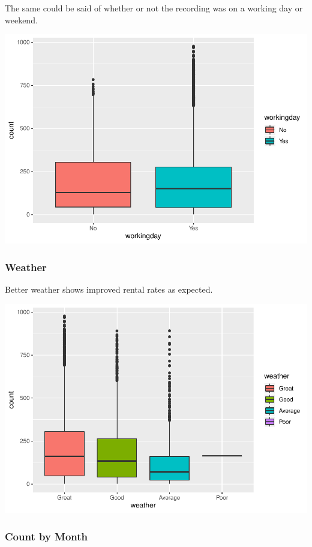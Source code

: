 \documentclass[american,]{article}
\begin{document}
The same could be said of whether or not the recording was on a working day or weekend.

\includegraphics{BikeSharingDemand_files/figure-latex/train.mod.1.workingday-1.pdf}

\newpage

\hypertarget{weather}{%
\subsubsection{Weather}\label{weather}}

Better weather shows improved rental rates as expected.

\includegraphics{BikeSharingDemand_files/figure-latex/train.mod.1.weather-1.pdf}

\newpage

\hypertarget{count-by-month}{%
\subsubsection{Count by Month}\label{count-by-month}}
\end{document}
